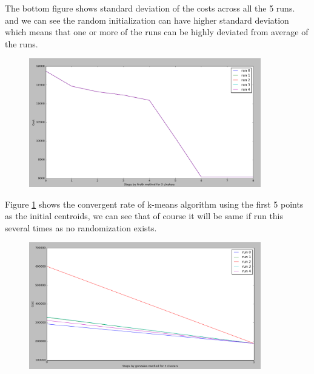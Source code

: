 The bottom figure shows standard deviation of the costs across all the 5 runs. and we can see the random initialization can have higher standard deviation which means that one or more of the runs can be highly deviated from average of the runs.


 



















\begin{figure}[!htb]
\centering
\includegraphics[width=0.9\textwidth]{shots/firstk5clusters.png}
\caption{ }
\label{firstk5clusters}
\end{figure}


Figure \ref{firstk5clusters} shows the convergent rate of k-means algorithm using the first 5 points as the initial centroids, we can see that of course it will be same if run this several times as no randomization exists.


\begin{figure}[!htb]
\centering
\includegraphics[width=0.9\textwidth]{shots/gonzales3clusters.png}
\caption{ }
\label{gonzales3clusters}
\end{figure}

